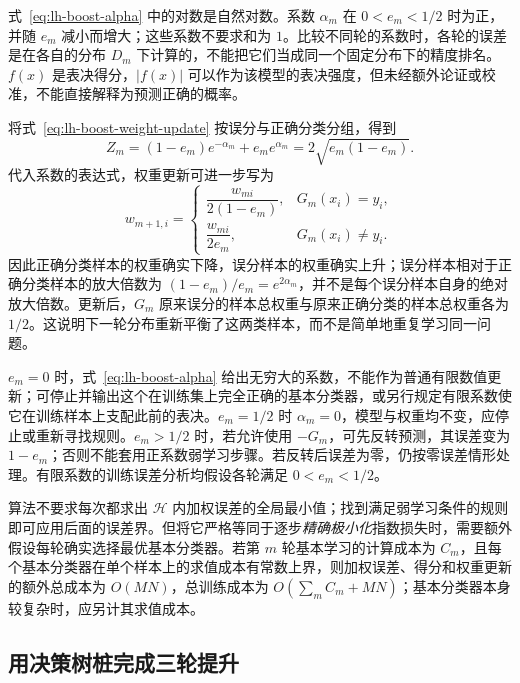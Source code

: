 式~\eqref{eq:lh-boost-alpha} 中的对数是自然对数。系数 $\alpha_m$ 在 $0<e_m<1/2$ 时为正，并随 $e_m$ 减小而增大；这些系数不要求和为 $1$。比较不同轮的系数时，各轮的误差是在各自的分布 $D_m$ 下计算的，不能把它们当成同一个固定分布下的精度排名。$f(x)$ 是表决得分，$|f(x)|$ 可以作为该模型的表决强度，但未经额外论证或校准，不能直接解释为预测正确的概率。

将式~\eqref{eq:lh-boost-weight-update} 按误分与正确分类分组，得到
\begin{equation}
 Z_m=(1-e_m)e^{-\alpha_m}+e_me^{\alpha_m}
     =2\sqrt{e_m(1-e_m)}.
 \label{eq:lh-boost-normalizer}
\end{equation}
代入系数的表达式，权重更新可进一步写为
\begin{equation}
 w_{m+1,i}=
 \begin{cases}
  \dfrac{w_{mi}}{2(1-e_m)},&G_m(x_i)=y_i,\\
  \dfrac{w_{mi}}{2e_m},&G_m(x_i)\ne y_i.
 \end{cases}
 \label{eq:lh-boost-weight-factors}
\end{equation}
因此正确分类样本的权重确实下降，误分样本的权重确实上升；误分样本相对于正确分类样本的放大倍数为 $(1-e_m)/e_m=e^{2\alpha_m}$，并不是每个误分样本自身的绝对放大倍数。更新后，$G_m$ 原来误分的样本总权重与原来正确分类的样本总权重各为 $1/2$。这说明下一轮分布重新平衡了这两类样本，而不是简单地重复学习同一问题。

\begin{notealert}[type=caution,title={有限系数公式的适用范围}]
$e_m=0$ 时，式~\eqref{eq:lh-boost-alpha} 给出无穷大的系数，不能作为普通有限数值更新；可停止并输出这个在训练集上完全正确的基本分类器，或另行规定有限系数使它在训练样本上支配此前的表决。$e_m=1/2$ 时 $\alpha_m=0$，模型与权重均不变，应停止或重新寻找规则。$e_m>1/2$ 时，若允许使用 $-G_m$，可先反转预测，其误差变为 $1-e_m$；否则不能套用正系数弱学习步骤。若反转后误差为零，仍按零误差情形处理。有限系数的训练误差分析均假设各轮满足 $0<e_m<1/2$。
\end{notealert}

算法不要求每次都求出 $\mathcal H$ 内加权误差的全局最小值；找到满足弱学习条件的规则即可应用后面的误差界。但将它严格等同于逐步\emph{精确极小化}指数损失时，需要额外假设每轮确实选择最优基本分类器。若第 $m$ 轮基本学习的计算成本为 $C_m$，且每个基本分类器在单个样本上的求值成本有常数上界，则加权误差、得分和权重更新的额外总成本为 $O(MN)$，总训练成本为 $O(\sum_mC_m+MN)$；基本分类器本身较复杂时，应另计其求值成本。

\subsection{用决策树桩完成三轮提升}
\label{subsec:lh-boost-classification-example}

